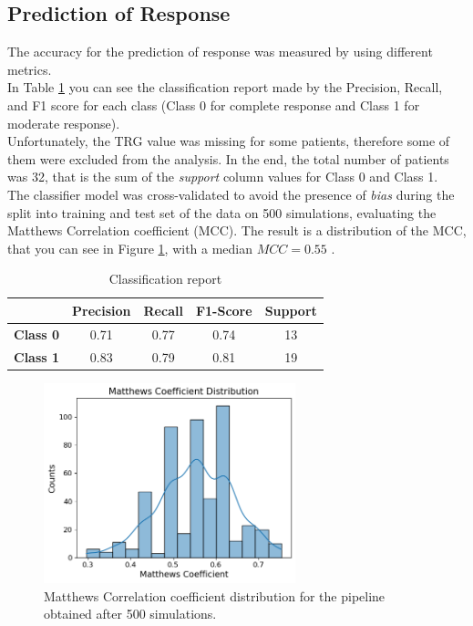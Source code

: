 \documentclass{standalone}
\begin{document}
\subsection{Prediction of Response}

The accuracy for the prediction of response was measured by using different metrics.
\\
In Table \ref{tab:classreport} you can see the classification report made by the Precision, Recall, and F1 score for each class (Class 0 for complete response and Class 1 for moderate response).
\\
Unfortunately, the TRG value was missing for some patients, therefore some of them were excluded from the analysis.
In the end, the total number of patients was 32, that is the sum of the \textit{support} column values for Class 0 and Class 1.
\\
The classifier model was cross-validated to avoid the presence of \textit{bias} during the split into training and test set of the data on 500 simulations, evaluating the Matthews Correlation coefficient (MCC).
The result is a distribution of the MCC, that you can see in Figure \ref{MCC}, with a median $MCC=0.55$ .

\begin{table}[ht]
	\centering
	\begin{tabular}{ccccc}
		\toprule
		  & \textbf{Precision}  & \textbf{Recall} & \textbf{F1-Score} & \textbf{Support}\\
	    \midrule
		\textbf{Class 0} &  0.71 &  0.77 &  0.74 &  13\\
	    \midrule
		\textbf{Class 1} &  0.83 &  0.79 &  0.81 &  19\\
		\bottomrule
	\end{tabular}
	\caption{Classification report}
	\label{tab:classreport}
\end{table}



\begin{figure}[ht]

	\centering
	\includegraphics[width=0.65\textwidth]{../images/MCC.png}

	\caption{Matthews Correlation coefficient distribution for the pipeline obtained after 500 simulations.}
	\label{MCC}
	
	\end{figure}
\end{document}
